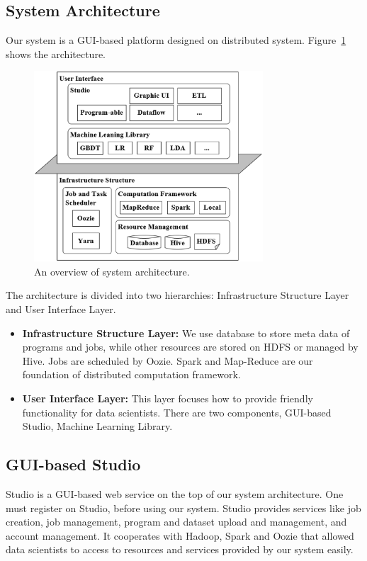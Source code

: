 \documentclass{sig-alternate-05-2015}
\begin{document}
\subsection{System Architecture}
Our system is a GUI-based platform designed on distributed system. Figure~\ref{fig:arch} shows the architecture.

\begin{figure}[!htb]
\centering
\includegraphics[height=2.8in]{arch.eps}
\caption{ An overview of system architecture.}
\label{fig:arch}
\end{figure}

The architecture is divided into two hierarchies: Infrastructure Structure Layer and User Interface Layer.
\begin{itemize}
\item \textbf{Infrastructure Structure Layer:} We use database to store meta data of programs and jobs, while other resources are stored on HDFS or managed by Hive. Jobs are scheduled by Oozie. Spark and Map-Reduce are our foundation of distributed computation framework.
\item \textbf{User Interface Layer:} This layer focuses how to provide friendly functionality for data scientists. There are two components, GUI-based Studio, Machine Learning Library.
\end{itemize}


\subsection{GUI-based Studio}
Studio is a GUI-based web service on the top of our system architecture. One must register on Studio, before using our system. Studio provides services like job creation, job management, program and dataset upload and management, and account management. It cooperates with Hadoop, Spark and Oozie that allowed data scientists to access to resources and services provided by our system easily.
\end{document}
